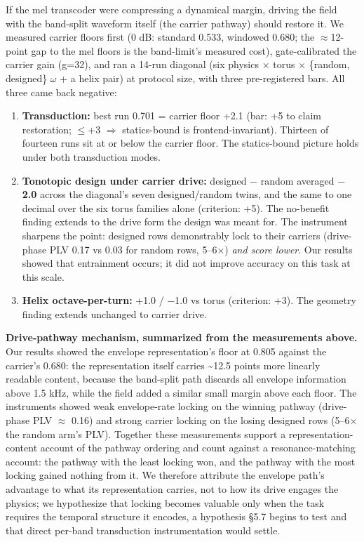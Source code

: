 \documentclass{article}
\providecommand{\tightlist}{%
  \setlength{\itemsep}{0pt}\setlength{\parskip}{0pt}}
\begin{document}
If the mel transcoder were compressing a dynamical margin, driving the
field with the band-split waveform itself (the carrier pathway) should
restore it. We measured carrier floors first (0 dB: standard 0.533,
windowed 0.680; the \ensuremath{\approx}12-point gap to the mel floors
is the band-limit's measured cost), gate-calibrated the carrier gain
(g=32), and ran a 14-run diagonal (six physics \ensuremath{\times} torus
\ensuremath{\times} \{random, designed\} \ensuremath{\omega} + a helix
pair) at protocol size, with three pre-registered bars. All three came
back negative:

\begin{enumerate}
\def\labelenumi{\arabic{enumi}.}
\tightlist
\item
  \textbf{Transduction:} best run 0.701 = carrier floor +2.1 (bar: +5 to
  claim restoration; \ensuremath{\leq}+3 \ensuremath{\Rightarrow}
  statics-bound is frontend-invariant). Thirteen of fourteen runs sit at
  or below the carrier floor. The statics-bound picture holds under both
  transduction modes.
\item
  \textbf{Tonotopic design under carrier drive:} designed \ensuremath{-}
  random averaged \textbf{\ensuremath{-}2.0} across the diagonal's seven
  designed/random twins, and the same to one decimal over the six torus
  families alone (criterion: +5). The no-benefit finding extends to the
  drive form the design was meant for. The instrument sharpens the
  point: designed rows demonstrably lock to their carriers (drive-phase
  PLV 0.17 vs 0.03 for random rows, 5--6\ensuremath{\times}) \emph{and
  score lower}. Our results showed that entrainment occurs; it did not
  improve accuracy on this task at this scale.
\item
  \textbf{Helix octave-per-turn:} +1.0 / \ensuremath{-}1.0 vs torus
  (criterion: +3). The geometry finding extends unchanged to carrier
  drive.
\end{enumerate}

\textbf{Drive-pathway mechanism, summarized from the measurements
above.} Our results showed the envelope representation's floor at 0.805
against the carrier's 0.680: the representation itself carries
\textasciitilde12.5 points more linearly readable content, because the
band-split path discards all envelope information above 1.5 kHz, while
the field added a similar small margin above each floor. The instruments
showed weak envelope-rate locking on the winning pathway (drive-phase
PLV \ensuremath{\approx} 0.16) and strong carrier locking on the losing
designed rows (5--6\ensuremath{\times} the random arm's PLV). Together
these measurements support a representation-content account of the
pathway ordering and count against a resonance-matching account: the
pathway with the least locking won, and the pathway with the most
locking gained nothing from it. We therefore attribute the envelope
path's advantage to what its representation carries, not to how its
drive engages the physics; we hypothesize that locking becomes valuable
only when the task requires the temporal structure it encodes, a
hypothesis §5.7 begins to test and that direct per-band transduction
instrumentation would settle.
\end{document}
